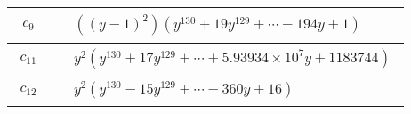 \documentclass[1p]{elsarticle_modified}
\theoremstyle{definition}
\begin{document}
\begin{tabular}{m{50pt}|m{274pt}}
\hline $$\begin{aligned}c_{9}\end{aligned}$$&$\begin{aligned}
&((y-1)^2)(y^{130}+19 y^{129}+\cdots-194 y+1)
\end{aligned}$\\
\hline $$\begin{aligned}c_{11}\end{aligned}$$&$\begin{aligned}
&y^2(y^{130}+17 y^{129}+\cdots+5.93934\times10^{7} y+1183744)
\end{aligned}$\\
\hline $$\begin{aligned}c_{12}\end{aligned}$$&$\begin{aligned}
&y^2(y^{130}-15 y^{129}+\cdots-360 y+16)
\end{aligned}$\\
\hline
\end{tabular}
\vskip 2pc
\end{document}
